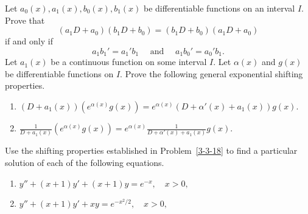\begin{Exercise}
\begin{enumerate}[label=(\roman*),noitemsep]
\end{enumerate}
\Question\label{3-3-17} Let $a_0(x), a_1(x), b_0(x), b_1(x)$ be differentiable functions on an interval $I.$ Prove that 
\[(a_1 D+a_0)(b_1D+b_0) =(b_1D+b_0)(a_1 D+a_0)\] if and only if \[a_1b_1'= a_1'b_1\quad \mbox{ and }\quad a_1b_0'= a_0'b_1.\]
\Question\label{3-3-18} Let $a_1(x)$ be a continuous function on some interval $I.$ Let $\alpha(x)$ and $g(x)$ be  differentiable functions on $I.$   Prove the following general exponential shifting properties.
\begin{enumerate}[label=(\roman*), noitemsep]
	\item \((D+a_1(x))(e^{\alpha (x)} g(x)) = e^{\alpha(x)} (D+\alpha'(x)+a_1(x)) g(x).\)
	\item \(\displaystyle\frac{1}{D+a_1(x)}(e^{\alpha (x)} g(x)) = e^{\alpha(x)} \frac{1}{D+\alpha'(x)+a_1(x)} g(x).\)
\end{enumerate}
\Question\label{3-3-19}  Use the shifting properties established in  Problem~\ref{3-3-18} to find a particular solution of each of the following equations.
\begin{enumerate}[label=(\roman*), noitemsep]
	\item \(y''+(x+1)y'+(x+1)y= e^{-x}, \quad x>0,\)
	\item \(y''+(x+1)y'+xy= e^{-x^2/2}, \quad x>0,\)
\end{enumerate}
\end{Exercise}


